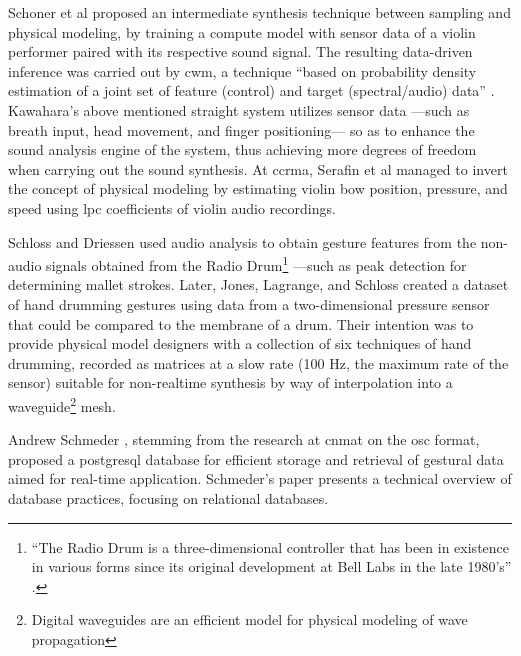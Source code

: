 Schoner et al \parencite{DBLP:conf/icmc/SchonerCDG98} proposed an intermediate synthesis technique between sampling and physical modeling, by training a compute model with sensor data of a violin performer paired with its respective sound signal. The resulting data-driven inference was carried out by \gls{cwm}, a technique ``based on probability density estimation of a joint set of feature (control) and target (spectral/audio) data'' \parencite{DBLP:conf/icmc/SchonerCDG98}. Kawahara's above mentioned \gls{straight} system \parencite{icmc/bbp2372.1999.411} utilizes sensor data ---such as breath input, head movement, and finger positioning--- so as to enhance the sound analysis engine of the system, thus achieving more degrees of freedom when carrying out the sound synthesis. At \gls{ccrma}, Serafin et al \parencite{icmc/bbp2372.2001.071} managed to invert the concept of physical modeling by estimating violin bow position, pressure, and speed using \gls{lpc} coefficients of violin audio recordings. 

Schloss and Driessen \parencite{icmc/bbp2372.2001.103} used audio analysis to obtain gesture features from the non-audio signals obtained from the Radio Drum\footnote{``The Radio Drum is a three-dimensional controller that has been in existence in various forms since its original development at Bell Labs in the late 1980's'' \parencite{icmc/bbp2372.2001.103}.} ---such as peak detection for determining mallet strokes. Later, Jones, Lagrange, and Schloss \parencite{DBLP:conf/icmc/JonesLS07} created a dataset of hand drumming gestures using data from a two-dimensional pressure sensor that could be compared to the membrane of a drum. Their intention was to provide physical model designers with a collection of six techniques of hand drumming, recorded as matrices at a slow rate (100 Hz, the maximum rate of the sensor) suitable for non-realtime synthesis by way of interpolation into a waveguide\footnote{Digital waveguides are an efficient model for physical modeling of wave propagation} mesh.

Andrew Schmeder \parencite{icmc/bbp2372.2009.005}, stemming from the research at \gls{cnmat} on the \gls{osc} format, proposed a \gls{postgresql} database for efficient storage and retrieval of gestural data aimed for real-time application. Schmeder's paper presents a technical overview of database practices, focusing on relational databases.

